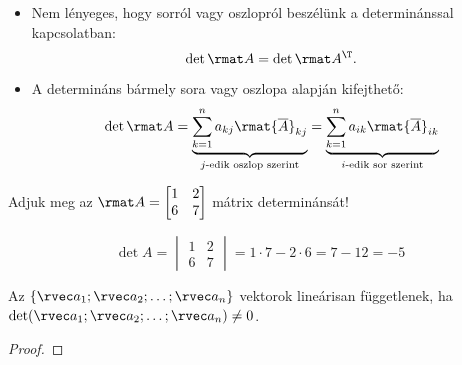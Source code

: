 \begin{note}
  \begin{itemize}
    \item Nem lényeges, hogy sorról vagy oszlopról beszélünk a determinánssal
          kapcsolatban:
          $$
            \det \rmat A = \det \rmat A^\T
            \text.
          $$

    \item A determináns bármely sora vagy oszlopa alapján kifejthető:
          $$
            \det \rmat A
            = \underbrace{
              \sum_{k = 1}^n a_{kj} \rmat{\overline A}_{kj}
            }_{\text{$j$-edik oszlop szerint}}
            = \underbrace{
              \sum_{k = 1}^n a_{ik} \rmat{\overline A}_{ik}
            }_{\text{$i$-edik sor szerint}}
          $$
  \end{itemize}
\end{note}

\begin{example}
  \bgroup\sffamily
  Adjuk meg az $\rmat A = \begin{bmatrix}
      1 & 2 \\ 6 & 7
    \end{bmatrix}$ mátrix determinánsát!
  \egroup

  \hdashrule[.8ex][x]{\dimexpr\textwidth}{1pt}{2mm 3pt}
  $$
    \det A = \begin{vmatrix}
      1 & 2 \\ 6 & 7
    \end{vmatrix} = 1 \cdot 7 - 2 \cdot 6 = 7 - 12 = -5
  $$
\end{example}


\begin{theorem}
  Az $\{\rvec a_1; \rvec a_2; \ldots; \rvec a_n\}$ vektorok lineárisan
  függetlenek, ha $\det(\rvec a_1; \rvec a_2; \ldots; \rvec a_n) \neq 0$.

  \begin{proof}
    \vspace{10em}
  \end{proof}
\end{theorem}

